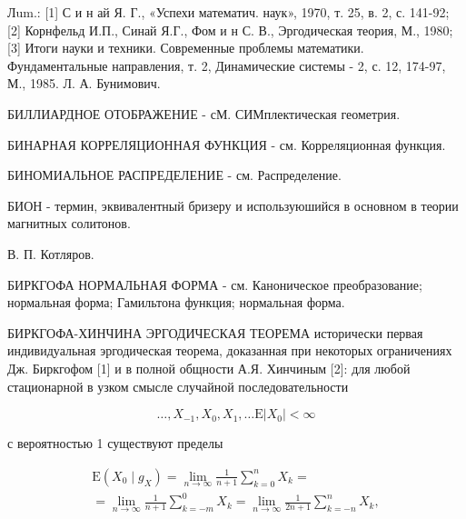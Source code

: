 \documentclass[10pt]{article}
\begin{document}
Лum.: [1] С и н ай Я. Г., «Успехи математич. наук», 1970, т. 25, в. 2, с. 141-92; [2] Корнфельд И.П., Синай Я.Г., Фом и н С. В., Эргодическая теория, М., 1980; [3] Итоги науки и техники. Современные проблемы математики. Фундаментальные направления, т. 2, Динамические системы - 2, с. 12, 174-97, М., 1985. Л. А. Бунимович.



БИЛЛИАРДНОЕ ОТОБРАЖЕНИЕ - сМ. СИМплектическая геометрия.



БИНАРНАЯ КОРРЕЛЯЦИОННАЯ ФУНКЦИЯ - см. Корреляционная функция.



БИНОМИАЛЬНОЕ РАСПРЕДЕЛЕНИЕ - см. Распределение.



БИОН - термин, эквивалентный бризеру и используюшийся в основном в теории магнитных солитонов.



В. П. Котляров.



БИРКГОФА НОРМАЛЬНАЯ ФОРМА - см. Каноническое преобразование; нормальная форма; Гамильтона функция; нормальная форма.



БИРКГОФА-ХИНЧИНА ЭРГОДИЧЕСКАЯ ТЕОРЕМА исторически первая индивидуальная эргодическая теорема, доказанная при некоторых ограничениях Дж. Биркгофом [1] и в полной общности А.Я. Хинчиным [2]: для любой стационарной в узком смысле случайной последовательности



\[

\ldots, X_{-1}, X_{0}, X_{1}, \ldots \mathrm{E}\left|X_{0}\right|<\infty

\]



с вероятностью 1 существуют пределы



\[

\begin{gathered}

\mathrm{E}\left(X_{0} \mid g_{X}\right)=\lim _{n \rightarrow \infty} \frac{1}{n+1} \sum_{k=0}^{n} X_{k}= \\

=\lim _{n \rightarrow \infty} \frac{1}{n+1} \sum_{k=-m}^{0} X_{k}=\lim _{n \rightarrow \infty} \frac{1}{2 n+1} \sum_{k=-n}^{n} X_{k},

\end{gathered}

\]
\end{document}
